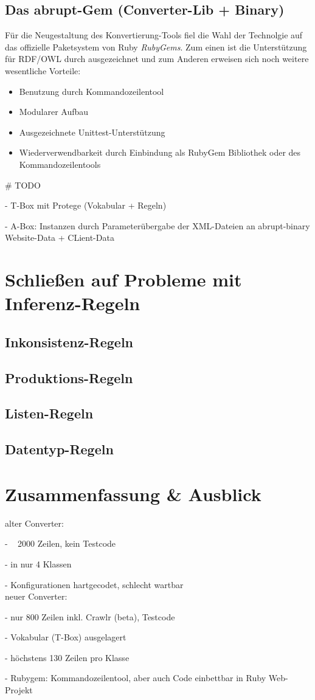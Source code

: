 \documentclass[runningheads,a4paper]{llncs}
\begin{document}
\subsection{Das abrupt-Gem (Converter-Lib + Binary)}
Für die Neugestaltung des Konvertierung-Tools fiel die Wahl der Technolgie auf das offizielle Paketsystem von Ruby \textit{RubyGems}. 
Zum einen ist die Unterstützung für RDF/OWL durch \cite{ruby-rdf} ausgezeichnet und zum Anderen erweisen sich noch weitere wesentliche Vorteile:
\begin{itemize}
\item{Benutzung durch Kommandozeilentool}
\item{Modularer Aufbau}
\item{Ausgezeichnete Unittest-Unterstützung}
\item{Wiederverwendbarkeit durch Einbindung als RubyGem Bibliothek oder des Kommandozeilentools}
\end{itemize}
\# TODO



- T-Box mit Protege (Vokabular + Regeln)

- A-Box: Instanzen durch Parameterübergabe der XML-Dateien an abrupt-binary Website-Data + CLient-Data

\newpage

\section{Schließen auf Probleme mit Inferenz-Regeln}
\subsection{Inkonsistenz-Regeln}
\subsection{Produktions-Regeln}
\subsection{Listen-Regeln}
\subsection{Datentyp-Regeln}

\section{Zusammenfassung \& Ausblick}
alter Converter:

- ~ 2000 Zeilen, kein Testcode

- in nur 4 Klassen

- Konfigurationen hartgecodet, schlecht wartbar
\\
neuer Converter:

- nur 800 Zeilen inkl. Crawlr (beta), Testcode

- Vokabular (T-Box) ausgelagert

- höchstens 130 Zeilen pro Klasse

- Rubygem: Kommandozeilentool, aber auch Code einbettbar in Ruby Web-Projekt


\nocite{url_dl_primer}



\end{document}
